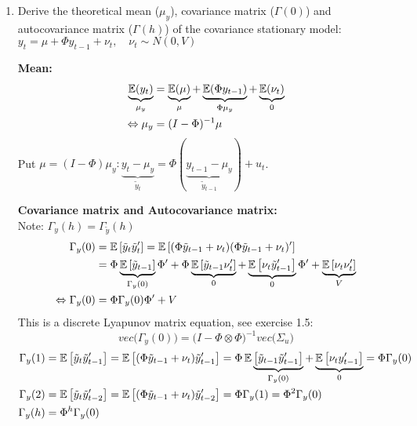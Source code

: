 \begin{enumerate}
\item Derive the theoretical mean ($\mu_y$), covariance matrix ($\Gamma(0)$) and autocovariance matrix ($\Gamma(h)$) of the covariance stationary \varp[1]{} model: $y_t = \mu + \Phi y_{t-1} + \nu_t, \quad \nu_t \sim N(0, V)$

\begin{sol}
    \textbf{Mean:} \\
    \begin{align*}
        \underbrace{\operatorname*{\mathbb{E}}(y_t)}_{\mu_y}
        & = \underbrace{\operatorname*{\mathbb{E}}(\mu)}_{\mu}
        + \underbrace{\operatorname*{\mathbb{E}}(\Phi y_{t-1})}_{\Phi \mu_y}
        + \underbrace{\operatorname*{\mathbb{E}}(\nu_t)}_{0}
        \\
        \Leftrightarrow \mu_y      
        & = (I - \Phi)^{-1} \mu
    \end{align*}
    Put $\mu = (I - \Phi) \mu_y:
    \underbrace{y_t -\mu_y}_{ \tilde{y}_{t}}
    = \Phi (\underbrace{y_{t-1} - \mu_y}_{\tilde{y}_{t-1}})
    + u_t$.


    \textbf{Covariance matrix and Autocovariance matrix:} \\
    Note: $\Gamma_y(h) = \Gamma_{\tilde{y}}(h)$
    \begin{align*}
        \Gamma_y(0)
        & = \operatorname*{\mathbb{E}}\left[\tilde{y}_t \tilde{y}_t'\right]
        = \operatorname*{\mathbb{E}}\left[(\Phi \tilde{y}_{t-1} + \nu_t)(\Phi \tilde{y}_{t-1} + \nu_t)'\right]
        \\
        & = \Phi \underbrace{\operatorname*{\mathbb{E}}\left[\tilde{y}_{t-1}\right]}_{\Gamma_y(0)} \Phi'
        + \Phi \underbrace{\operatorname*{\mathbb{E}}\left[\tilde{y}_{t-1}\nu_t'\right]}_{0}
        + \underbrace{\operatorname*{\mathbb{E}}\left[\nu_t \tilde{y}_{t-1}'\right]}_{0} \Phi'
        + \underbrace{\operatorname*{\mathbb{E}}\left[\nu_t \nu_t'\right]}_{V}
        \\
        \Leftrightarrow \Gamma_y(0)
        & = \Phi \Gamma_y(0) \Phi' + V
    \end{align*}
    This is a discrete Lyapunov matrix equation, see exercise 1.5:
    \[
        vec\bigg( \Gamma_y(0) \bigg)
        = \bigg( I - \Phi \otimes \Phi \bigg)^{-1} vec\bigg( \Sigma_u \bigg)
    \]
    \begin{align*}
        \Gamma_y(1)
        & = \operatorname*{\mathbb{E}}\left[\tilde{y}_t \tilde{y}_{t-1}'\right]
        = \operatorname*{\mathbb{E}}\left[(\Phi \tilde{y}_{t-1} + \nu_t)\tilde{y}_{t-1}'\right]
        = \Phi \operatorname*{\mathbb{E}}\underbrace{
            \left[\tilde{y}_{t-1}\tilde{y}_{t-1}'\right]
        }_{\Gamma_y(0)}
        + \underbrace{\operatorname*{\mathbb{E}}\left[\nu_t y_{t-1}'\right]}_{0}
        = \Phi \Gamma_y(0)
        \\
        \Gamma_y(2)
        & =  \operatorname*{\mathbb{E}}\left[\tilde{y}_t \tilde{y}_{t-2}'\right]
        = \operatorname*{\mathbb{E}}\left[(\Phi \tilde{y}_{t-1} + \nu_t)\tilde{y}_{t-2}'\right]
        = \Phi \Gamma_y(1) = \Phi^2 \Gamma_y(0)
        \\
        \Gamma_y(h)
        & = \Phi^h \Gamma_y(0)
    \end{align*}
\end{sol}


\end{enumerate}

